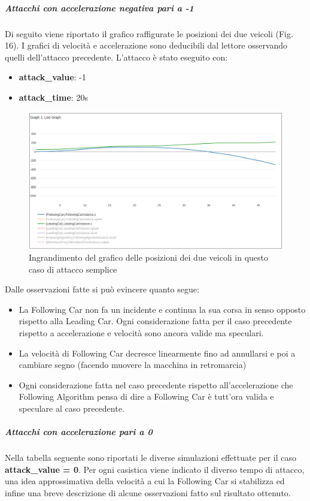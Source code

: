 \subparagraph{Attacchi con accelerazione negativa pari a -1}
Di seguito viene riportato il grafico raffigurate le posizioni dei due veicoli (Fig. 16). I grafici di velocità e accelerazione sono deducibili dal lettore osservando quelli dell'attacco precedente.
L'attacco è stato eseguito con:
\begin{itemize}
	\item \textbf{attack\_value}: -1
	\item \textbf{attack\_time}: 20s
\end{itemize}
\begin{figure}[H]
	\centering
	\includegraphics[width=\textwidth]{img/AttackAccel-1XZoomed.png}
	\caption{Ingrandimento del grafico delle posizioni dei due veicoli in questo caso di attacco semplice}
\end{figure}

Dalle osservazioni fatte si può evincere quanto segue:
\begin{itemize}
	\item La Following Car non fa un incidente e continua la sua corsa in senso opposto rispetto alla Leading Car. Ogni considerazione fatta per il caso precedente rispetto a accelerazione e velocità sono ancora valide ma speculari.
	\item La velocità di Following Car decresce linearmente fino ad annullarsi e poi a cambiare segno (facendo muovere la macchina in retromarcia)
	\item Ogni considerazione fatta nel caso precedente rispetto all'accelerazione che Following Algorithm pensa di dire a Following  Car è tutt'ora valida e speculare al caso precedente.
\end{itemize}

\subparagraph{Attacchi con accelerazione pari a 0}
Nella tabella seguente sono riportati le diverse simulazioni effettuate per il caso \textbf{attack\_value = 0}. Per ogni casistica viene indicato il diverso tempo di attacco, una idea approssimativa della velocità a cui la Following Car si stabilizza ed infine una breve descrizione di alcune osservazioni fatto sul risultato ottenuto.

